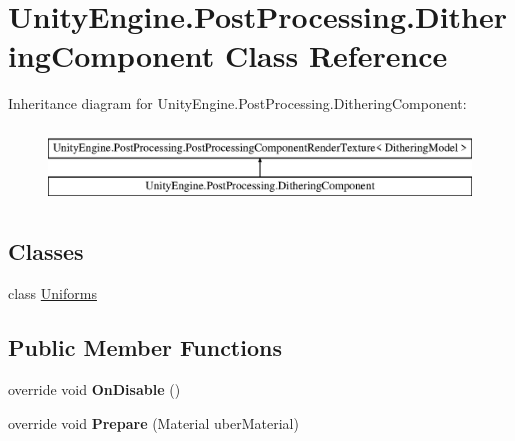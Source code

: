 \hypertarget{class_unity_engine_1_1_post_processing_1_1_dithering_component}{}\section{Unity\+Engine.\+Post\+Processing.\+Dithering\+Component Class Reference}
\label{class_unity_engine_1_1_post_processing_1_1_dithering_component}
Inheritance diagram for Unity\+Engine.\+Post\+Processing.\+Dithering\+Component\+:\begin{figure}[H]
\begin{center}
\leavevmode
\includegraphics[height=2.000000cm]{class_unity_engine_1_1_post_processing_1_1_dithering_component}
\end{center}
\end{figure}
\subsection*{Classes}
\begin{DoxyCompactItemize}
\item 
class \hyperlink{class_unity_engine_1_1_post_processing_1_1_dithering_component_1_1_uniforms}{Uniforms}
\end{DoxyCompactItemize}
\subsection*{Public Member Functions}
\begin{DoxyCompactItemize}
\item 
\mbox{\label{class_unity_engine_1_1_post_processing_1_1_dithering_component_a3972d813f7d1913798fc142e53d8b352}} 
override void {\bfseries On\+Disable} ()
\item 
\mbox{\label{class_unity_engine_1_1_post_processing_1_1_dithering_component_af47fb039901b2434cfe5cd377cf559be}} 
override void {\bfseries Prepare} (Material uber\+Material)
\end{DoxyCompactItemize}
